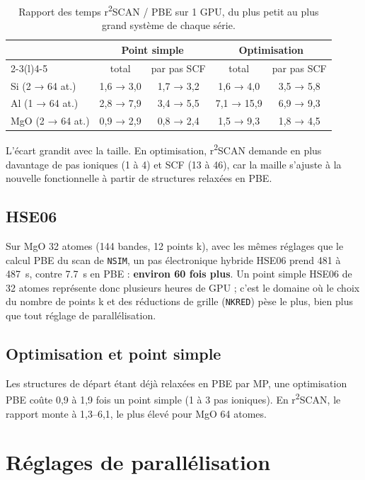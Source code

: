\documentclass[11pt,a4paper]{article}
\newcommand{\rscan}{r\textsuperscript{2}SCAN}
\begin{document}
\begin{table}[htbp]
\centering
\caption{Rapport des temps \rscan{} / PBE sur 1 GPU, du plus petit au plus grand système de
chaque série.}
\label{tab:r2}
\small
\begin{tabular}{@{}l cccc@{}}
\toprule
 & \multicolumn{2}{c}{Point simple} & \multicolumn{2}{c}{Optimisation} \\
\cmidrule(lr){2-3}\cmidrule(l){4-5}
 & total & par pas SCF & total & par pas SCF \\
\midrule
Si (2 → 64 at.)  & 1,6 → 3,0 & 1,7 → 3,2 & 1,6 → 4,0 & 3,5 → 5,8 \\
Al (1 → 64 at.)  & 2,8 → 7,9 & 3,4 → 5,5 & 7,1 → 15,9 & 6,9 → 9,3 \\
MgO (2 → 64 at.) & 0,9 → 2,9 & 0,8 → 2,4 & 1,5 → 9,3 & 1,8 → 4,5 \\
\bottomrule
\end{tabular}
\end{table}

L'écart grandit avec la taille. En optimisation, \rscan{} demande en plus davantage de pas
ioniques (1 à 4) et SCF (13 à 46), car la maille s'ajuste à la nouvelle fonctionnelle à partir
de structures relaxées en PBE.

\subsection{HSE06}

Sur MgO 32 atomes (144 bandes, 12 points k), avec les mêmes réglages que le calcul PBE du scan
de \texttt{NSIM}, un pas électronique hybride HSE06 prend \SI{481}{} à \SI{487}{s}, contre
\SI{7,7}{s} en PBE : \textbf{environ 60 fois plus}. Un point simple HSE06 de 32 atomes
représente donc plusieurs heures de GPU ; c'est le domaine où le choix du nombre de points k
et des réductions de grille (\texttt{NKRED}) pèse le plus, bien plus que tout réglage de
parallélisation.

\subsection{Optimisation et point simple}

Les structures de départ étant déjà relaxées en PBE par MP, une optimisation PBE coûte 0,9 à
1,9 fois un point simple (1 à 3 pas ioniques). En \rscan{}, le rapport monte à 1,3--6,1, le
plus élevé pour MgO 64 atomes.

\section{Réglages de parallélisation}
\label{sec:parallelisation}
\end{document}
